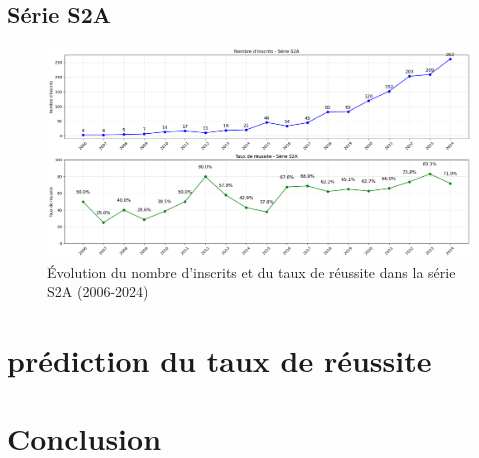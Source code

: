 \newpage
\subsection{Série S2A}

\begin{figure}[h]
\centering
\caption{Évolution du nombre d'inscrits et du taux de réussite dans la série S2A (2006-2024)}
\includegraphics[width=1\textwidth]{figure/bac_S2A.png}
\end{figure}

\newpage
\section{prédiction du taux de réussite}

\section{Conclusion}